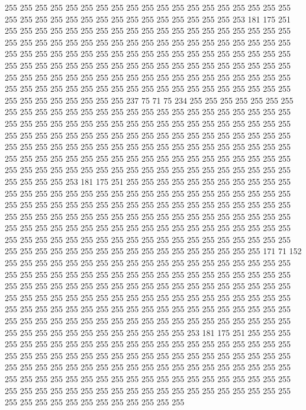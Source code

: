 255 255 255 255 255 255 255 255 255 255 255 255 255 255 255 255 255 255 255 255
255 255 255 255 255 255 255 255 255 255 255 255 255 255 253 181 175 251 255 255
255 255 255 255 255 255 255 255 255 255 255 255 255 255 255 255 255 255 255 255
255 255 255 255 255 255 255 255 255 255 255 255 255 255 255 255 255 255 255 255
255 255 255 255 255 255 255 255 255 255 255 255 255 255 255 255 255 255 255 255
255 255 255 255 255 255 255 255 255 255 255 255 255 255 255 255 255 255 255 255
255 255 255 255 255 255 255 255 255 255 255 255 255 255 255 255 255 255 255 255
255 255 255 255 255 255 255 255 255 255 255 255 255 255 255 255 255 255 255 255
237 75 71 75 234 255 255 255 255 255 255 255 255 255 255 255 255 255 255 255
255 255 255 255 255 255 255 255 255 255 255 255 255 255 255 255 255 255 255 255
255 255 255 255 255 255 255 255 255 255 255 255 255 255 255 255 255 255 255 255
255 255 255 255 255 255 255 255 255 255 255 255 255 255 255 255 255 255 255 255
255 255 255 255 255 255 255 255 255 255 255 255 255 255 255 255 255 255 255 255
255 255 255 255 255 255 255 255 255 255 255 255 255 255 255 255 255 255 255 255
255 255 255 255 255 255 255 255 255 255 253 181 175 251 255 255 255 255 255 255
255 255 255 255 255 255 255 255 255 255 255 255 255 255 255 255 255 255 255 255
255 255 255 255 255 255 255 255 255 255 255 255 255 255 255 255 255 255 255 255
255 255 255 255 255 255 255 255 255 255 255 255 255 255 255 255 255 255 255 255
255 255 255 255 255 255 255 255 255 255 255 255 255 255 255 255 255 255 255 255
255 255 255 255 255 255 255 255 255 255 255 255 255 255 255 255 255 255 255 255
255 255 255 255 255 255 255 255 255 255 255 255 255 255 255 255 255 171 71 152
255 255 255 255 255 255 255 255 255 255 255 255 255 255 255 255 255 255 255 255
255 255 255 255 255 255 255 255 255 255 255 255 255 255 255 255 255 255 255 255
255 255 255 255 255 255 255 255 255 255 255 255 255 255 255 255 255 255 255 255
255 255 255 255 255 255 255 255 255 255 255 255 255 255 255 255 255 255 255 255
255 255 255 255 255 255 255 255 255 255 255 255 255 255 255 255 255 255 255 255
255 255 255 255 255 255 255 255 255 255 255 255 255 255 255 255 255 255 255 255
255 255 255 255 255 255 253 181 175 251 255 255 255 255 255 255 255 255 255 255
255 255 255 255 255 255 255 255 255 255 255 255 255 255 255 255 255 255 255 255
255 255 255 255 255 255 255 255 255 255 255 255 255 255 255 255 255 255 255 255
255 255 255 255 255 255 255 255 255 255 255 255 255 255 255 255 255 255 255 255
255 255 255 255 255 255 255 255 255 255 255 255 255 255 255 255 255 255 255 255
255 255 255 255 255 255 255 255 255 255 255 255 255 255 255 255 255 255 255 255
